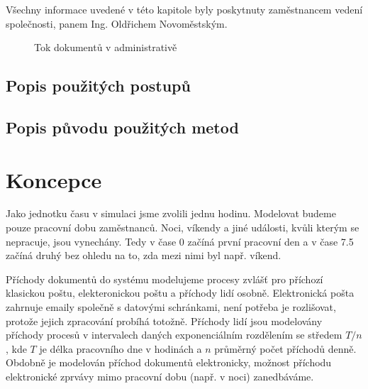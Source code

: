 \documentclass[12pt,a4paper]{article}
\begin{document}
Všechny informace uvedené v této kapitole byly poskytnuty zaměstnancem vedení spo\-leč\-nos\-ti, panem Ing. Oldřichem Novoměstským.

\begin{figure}[ht]
 \begin{center}
	\caption{Tok dokumentů v administrativě}
	\label{tok_dokumentu}
 \end{center}
\end{figure}

\subsection{Popis použitých postupů}
\subsection{Popis původu použitých metod}

\newpage

\section{Koncepce}

Jako jednotku času v simulaci jsme zvolili jednu hodinu.
Modelovat \cite{ims-zakladni-pojmy} budeme pouze pracovní dobu zaměstnanců. Noci, víkendy a jiné události, kvůli kterým se nepracuje, jsou vynechány.
Tedy v čase 0 začíná první pracovní den a v čase 7.5 začíná druhý bez ohledu na to, zda mezi nimi byl např. víkend.

Příchody dokumentů do systému modelujeme procesy zvlášť pro příchozí klasickou poštu, elekteronickou poštu a příchody lidí osobně.
Elektronická pošta zahrnuje emaily společně s datovými schránkami, není potřeba je rozlišovat, protože jejich zpracování probíhá totožně.
Příchody lidí jsou modelovány příchody procesů v intervalech daných exponenciálním rozdělením se středem $T/n$ \cite{ims-rozlozeni}, kde $T$ je délka pracovního dne v hodinách a $n$ průměrný počet příchodů denně.
Obdobně je modelován příchod dokumentů elektronicky, možnost příchodu elektronické zprvávy mimo pracovní dobu (např. v noci) zanedbáváme.
\end{document}
